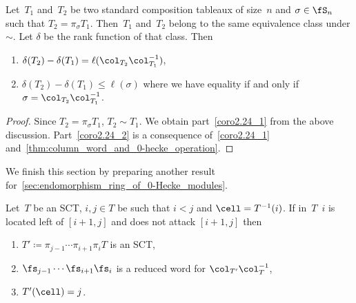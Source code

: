 \begin{coro}
	\label{thm:rank_in_E_and_column_word}
	Let~$T_1$ and~$T_2$ be two standard composition tableaux of size~$n$ and $\sigma \in \fS_n$ such that $T_2 = \pi_\sigma T_1$. Then~$T_1$ and~$T_2$ belong to the same equivalence class under $\sim$. Let $\delta$ be the rank function of that class. Then
	\begin{enumerate}
		\item\label{coro2.24_1} $\delta(T_2) - \delta(T_1) = \ell(\col_{T_2}\col^{-1}_{T_1})$,
		\item\label{coro2.24_2} $\delta(T_2) - \delta(T_1) \leq \ell(\sigma)$ where we have equality if and only if $\sigma = \col_{T_2}\col_{T_1}^{-1}$.
	\end{enumerate}
\end{coro}


\begin{proof} Since $T_2 = \pi_\sigma T_1$, $T_2 \sim T_1$.
We obtain part~\eqref{coro2.24_1} from the above discussion. Part~\eqref{coro2.24_2} is a consequence of~\eqref{coro2.24_1} and~\cref{thm:column_word_and_0-hecke_operation}.
\end{proof}

We finish this section by preparing another result for~\cref{sec:endomorphism_ring_of_0-Hecke_modules}.

\begin{prop}
	\label{thm:mutliple_flips_same_cell}
	
	Let~$T$ be an SCT, $i,j\in T$ be such that $i<j$ and $\cell = T^{-1}(i)$. If in~$T$~$i$ is located left of $[i+1,j]$
	and does not attack $[i+1,j]$ then 
	\begin{enumerate}	
		\item\label{prop2.25_1} $T'\coloneqq \pi_{j-1} \cdots \pi_{i+1}\pi_i T$ is an SCT,
		\item\label{prop2.25_2} $\fs_{j-1} \cdots \fs_{i+1}\fs_i$ is a reduced word for $\col_{T'}\col_T^{-1}$,
		\item\label{prop2.25_3} $T'(\cell)= j$.
	\end{enumerate}
\end{prop}

